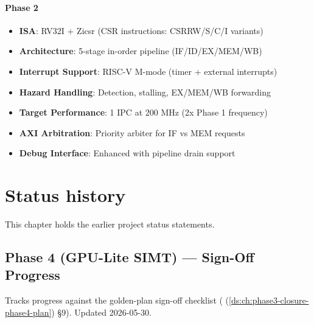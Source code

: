 \subsubsection{\texorpdfstring{Phase 2 \ok{}}{Phase 2 }}\label{cr:status:phase-history:phase-2-white-check-mark}

\begin{record}

\begin{itemize}
\tightlist
\item
  \textbf{ISA}: RV32I + Zicsr (CSR instructions:
  CSRRW/\allowbreak{}S/\allowbreak{}C/\allowbreak{}I variants)
\item
  \textbf{Architecture}: 5-stage in-order pipeline
  (IF/\allowbreak{}ID/\allowbreak{}EX/\allowbreak{}MEM/\allowbreak{}WB)
\item
  \textbf{Interrupt Support}: RISC-V M-mode (timer + external
  interrupts)
\item
  \textbf{Hazard Handling}: Detection, stalling, EX/MEM/WB forwarding
\item
  \textbf{Target Performance}: 1 IPC at 200 MHz (2x Phase 1 frequency)
\item
  \textbf{AXI Arbitration}: Priority arbiter for IF vs MEM requests
\item
  \textbf{Debug Interface}: Enhanced with pipeline drain support
\end{itemize}

\end{record}

\chapter{Status history}\label{cr:ch:status-history}

This chapter holds the earlier project status statements.

\section{Phase 4 (GPU-Lite SIMT) --- Sign-Off Progress}\label{cr:status:phase4-progress}

\begin{record}

Tracks progress against the golden-plan sign-off checklist
( (\cref{ds:ch:phase3-closure-phase4-plan}) §9). Updated 2026-05-30.

\end{record}

